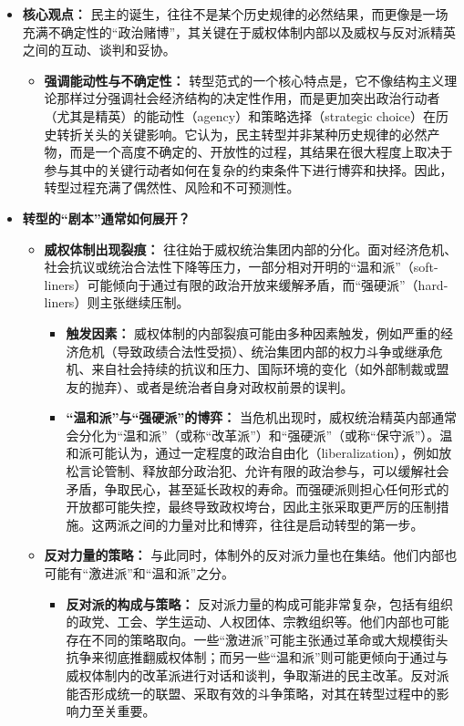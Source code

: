 \documentclass[UTF8, 10pt]{ctexbook}
\begin{document}
\begin{itemize}
    \item \textbf{核心观点：} 民主的诞生，往往不是某个历史规律的必然结果，而更像是一场充满不确定性的“政治赌博”，其关键在于威权体制内部以及威权与反对派精英之间的互动、谈判和妥协。
    \begin{itemize}
        \item \textbf{强调能动性与不确定性：} 转型范式的一个核心特点是，它不像结构主义理论那样过分强调社会经济结构的决定性作用，而是更加突出政治行动者（尤其是精英）的能动性（agency）和策略选择（strategic choice）在历史转折关头的关键影响。它认为，民主转型并非某种历史规律的必然产物，而是一个高度不确定的、开放性的过程，其结果在很大程度上取决于参与其中的关键行动者如何在复杂的约束条件下进行博弈和抉择。因此，转型过程充满了偶然性、风险和不可预测性。
    \end{itemize}
    \item \textbf{转型的“剧本”通常如何展开？}
    \begin{itemize}
        \item \textbf{威权体制出现裂痕：} 往往始于威权统治集团内部的分化。面对经济危机、社会抗议或统治合法性下降等压力，一部分相对开明的“温和派”（soft-liners）可能倾向于通过有限的政治开放来缓解矛盾，而“强硬派”（hard-liners）则主张继续压制。
        \begin{itemize}
            \item \textbf{触发因素：} 威权体制的内部裂痕可能由多种因素触发，例如严重的经济危机（导致政绩合法性受损）、统治集团内部的权力斗争或继承危机、来自社会持续的抗议和压力、国际环境的变化（如外部制裁或盟友的抛弃）、或者是统治者自身对政权前景的误判。
            \item \textbf{“温和派”与“强硬派”的博弈：} 当危机出现时，威权统治精英内部通常会分化为“温和派”（或称“改革派”）和“强硬派”（或称“保守派”）。温和派可能认为，通过一定程度的政治自由化（liberalization），例如放松言论管制、释放部分政治犯、允许有限的政治参与，可以缓解社会矛盾，争取民心，甚至延长政权的寿命。而强硬派则担心任何形式的开放都可能失控，最终导致政权垮台，因此主张采取更严厉的压制措施。这两派之间的力量对比和博弈，往往是启动转型的第一步。
        \end{itemize}
        \item \textbf{反对力量的策略：} 与此同时，体制外的反对派力量也在集结。他们内部也可能有“激进派”和“温和派”之分。
        \begin{itemize}
            \item \textbf{反对派的构成与策略：} 反对派力量的构成可能非常复杂，包括有组织的政党、工会、学生运动、人权团体、宗教组织等。他们内部也可能存在不同的策略取向。一些“激进派”可能主张通过革命或大规模街头抗争来彻底推翻威权体制；而另一些“温和派”则可能更倾向于通过与威权体制内的改革派进行对话和谈判，争取渐进的民主改革。反对派能否形成统一的联盟、采取有效的斗争策略，对其在转型过程中的影响力至关重要。

\end{itemize}
\end{itemize}
\end{itemize}
\end{document}
